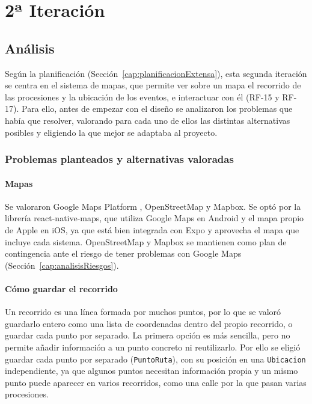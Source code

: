 \section{2ª Iteración}\label{cap:2_iteracion}

\subsection{Análisis}

Según la planificación (Sección~\ref{cap:planificacionExtensa}), esta segunda iteración se centra en el sistema de mapas, que permite ver sobre un mapa el recorrido de las procesiones y la ubicación de los eventos, e interactuar con él (RF-15 y RF-17). Para ello, antes de empezar con el diseño se analizaron los problemas que había que resolver, valorando para cada uno de ellos las distintas alternativas posibles y eligiendo la que mejor se adaptaba al proyecto.

\subsubsection{Problemas planteados y alternativas valoradas}

\paragraph{Mapas}
Se valoraron Google Maps Platform \cite{googlemapsapi}, OpenStreetMap \cite{openstreetmap} y Mapbox. Se optó por la librería react-native-maps, que utiliza Google Maps en Android y el mapa propio de Apple en iOS, ya que está bien integrada con Expo y aprovecha el mapa que incluye cada sistema. OpenStreetMap y Mapbox se mantienen como plan de contingencia ante el riesgo de tener problemas con Google Maps (Sección~\ref{cap:analisisRiesgos}).

\paragraph{Cómo guardar el recorrido}
Un recorrido es una línea formada por muchos puntos, por lo que se valoró guardarlo entero como una lista de coordenadas dentro del propio recorrido, o guardar cada punto por separado. La primera opción es más sencilla, pero no permite añadir información a un punto concreto ni reutilizarlo. Por ello se eligió guardar cada punto por separado (\texttt{PuntoRuta}), con su posición en una \texttt{Ubicacion} independiente, ya que algunos puntos necesitan información propia y un mismo punto puede aparecer en varios recorridos, como una calle por la que pasan varias procesiones.

